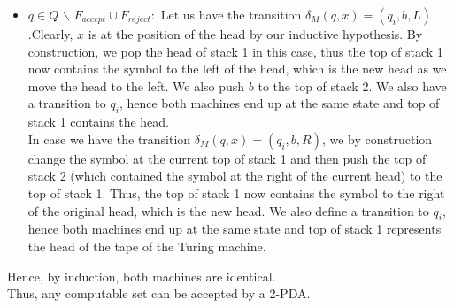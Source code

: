 \documentclass[12pt,a4paper]{article}
\begin{document}
\begin{itemize}
\begin{itemize}
        \item $q \in Q $ $\backslash$ $F_{accept} \cup F_{reject} : $ Let us have the transition $\delta_M(q,x) = (q_i,b,L)$.Clearly, $x$ is at the position of the head by our inductive hypothesis. By construction, we pop the head of stack 1 in this case, thus the top of stack 1 now contains the symbol to the left of the head, which is the new head as we move the head to the left. We also push $b$ to the top of stack 2. We also have a transition to $q_i$, hence both machines end up at the same state and top of stack 1 contains the head.
        \\In case we have the transition $\delta_M(q,x) = (q_i,b,R)$, we by construction change the symbol at the current top of stack 1 and then push the top of stack 2 (which contained the symbol at the right of the current head) to the top of stack 1. Thus, the top of stack 1 now contains the symbol to the right of the original head, which is the new head. We also define a transition to $q_i$, hence both machines end up at the same state and top of stack 1 represents the head of the tape of the Turing machine.
    \end{itemize}
\end{itemize}
Hence, by induction, both machines are identical.
\\Thus, any computable set can be accepted by a 2-PDA.
\end{document}
